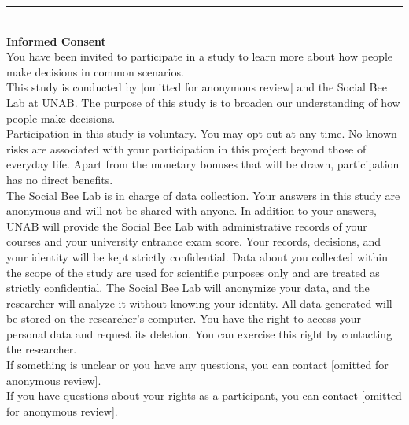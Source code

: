 \documentclass[11pt,a4paper,oneside]{article}
\begin{document}
\noindent\rule{\textwidth}{0.4pt}\\

\noindent \textbf{Informed Consent} \\ 

\noindent You have been invited to participate in a study to learn more about how people make decisions in common scenarios. \\

\noindent  This study is conducted by [omitted for anonymous review] and the Social Bee Lab at UNAB. The purpose of this study is to broaden our understanding of how people make decisions. \\


\noindent  Participation in this study is voluntary. You may opt-out at any time. No known risks are associated with your participation in this project beyond those of everyday life. Apart from the monetary bonuses that will be drawn, participation has no direct benefits.\\

\noindent  The Social Bee Lab is in charge of data collection. Your answers in this study are anonymous and will not be shared with anyone. In addition to your answers, UNAB will provide the Social Bee Lab with administrative records of your courses and your university entrance exam score. Your records, decisions, and your identity will be kept strictly confidential. Data about you collected within the scope of the study are used for scientific purposes only and are treated as strictly confidential. The Social Bee Lab will anonymize your data, and the researcher will analyze it without knowing your identity. All data generated will be stored on the researcher's computer. You have the right to access your personal data and request its deletion. You can exercise this right by contacting the researcher.\\

\noindent  If something is unclear or you have any questions, you can contact [omitted for anonymous review].\\


\noindent  If you have questions about your rights as a participant, you can contact [omitted for anonymous review].\\

\end{document}
